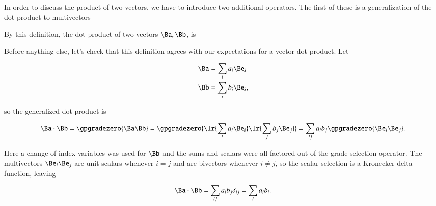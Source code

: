 In order to discuss the product of two vectors, we have to introduce two additional operators.  The first of these is a generalization of the dot product to multivectors


By this definition, the dot product of two vectors \( \Ba, \Bb \), is


Before anything else, let's check that this definition agrees with our expectations for a vector dot product.  Let

\begin{dmath}\label{eqn:SimpleProducts2:1160}
\begin{aligned}
\Ba &= \sum_i a_i \Be_i \\
\Bb &= \sum_i b_i \Be_i,
\end{aligned}
\end{dmath}

so the generalized dot product is

\begin{dmath}\label{eqn:SimpleProducts2:1180}
\Ba \cdot \Bb
=
\gpgradezero{ \Ba \Bb }
=
\gpgradezero{ \lr{ \sum_i a_i \Be_i }
\lr{ \sum_j b_j \Be_j }
}
=
\sum_{ij} a_i b_j \gpgradezero{ \Be_i \Be_j }.
\end{dmath}

Here a change of index variables was used for \( \Bb \) and the sums and scalars were all factored out of the grade selection operator.  The multivectors \( \Be_i \Be_j \) are unit scalars whenever \( i = j \) and are bivectors whenever \( i \ne j \), so the scalar selection is a Kronecker delta function, leaving

\begin{dmath}\label{eqn:SimpleProducts2:1200}
\Ba \cdot \Bb
=
\sum_{ij} a_i b_j \delta_{ij}
=
\sum_{i} a_i b_i.
\end{dmath}

